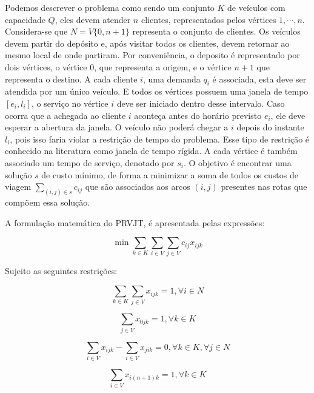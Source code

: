Podemos descrever o problema como sendo um conjunto \(K\) de veículos com capacidade \(Q\), eles devem atender \(n\) clientes, representados pelos vértices \(1,\cdots,n\). Considera-se que \(N = V \{0, n + 1\}\) representa o conjunto de clientes. Os veículos devem partir do depósito e, após visitar todos os clientes, devem retornar ao mesmo local de onde partiram. Por conveniência, o deposito é representado por dois vértices, o vértice \(0\), que representa a origem, e o vértice \(n+1\) que representa o destino. A cada cliente \(i\), uma demanda \(q_i\) é associada, esta deve ser atendida por um único veículo. E todos os vértices possuem uma janela de tempo \([e_i,l_i]\), o serviço no vértice \(i\) deve ser iniciado dentro desse intervalo. Caso ocorra que a achegada ao cliente \(i\) aconteça antes do horário previsto \(e_i\), ele deve esperar a abertura da janela. O veículo não poderá chegar a \(i\) depois do instante \(l_i\), pois isso faria violar a restrição de tempo do problema. Esse tipo de restrição é conhecido na literatura como janela de tempo rígida. A cada vértice é também associado um tempo de serviço, denotado por \(s_i\). O objetivo é encontrar uma solução \(s\) de custo mínimo, de forma a minimizar a soma de todos os custos de viagem \(\sum_{(i,j) \in s} c_{ij}\) que são associados aos arcos \((i,j)\) presentes nas rotas que compõem essa solução.

A formulação matemática do PRVJT, é apresentada pelas expressões:

\begin{equation}  \label{eq:prvjt1}
\min
 \sum_{k \in K}\sum_{i \in V}\sum_{j \in V} c_{ij}x_{ijk}
\end{equation}

Sujeito as seguintes restrições:

\begin{equation} \label{eq:prvjt2}
\sum_{k \in K}\sum_{j \in V} x_{ijk} = 1, \forall i \in N
\end{equation}

\begin{equation} \label{eq:prvjt3}
\sum_{j \in V} x_{0jk} = 1, \forall k \in K
\end{equation}

\begin{equation} \label{eq:prvjt4}
\sum_{i \in V} x_{ijk} - \sum_{i \in V} x_{jik} = 0, \forall k \in K, \forall j \in N
\end{equation}

\begin{equation} \label{eq:prvjt5}
\sum_{i \in V} x_{i(n+1)k} = 1, \forall k \in K
\end{equation}

